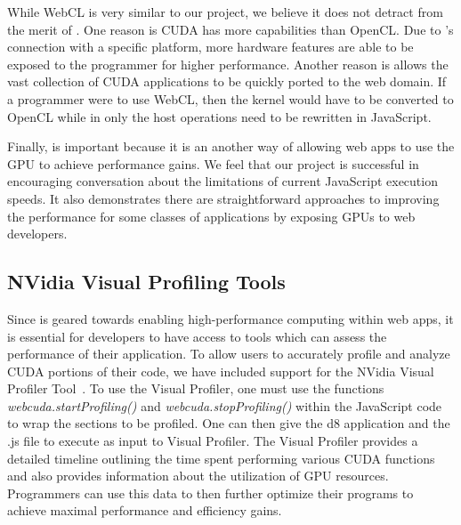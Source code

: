 While WebCL is very similar to our project, we believe it does not detract from
the merit of \namens. One reason is CUDA has more capabilities than OpenCL. Due
to \namens's connection with a specific platform, more hardware features are
able to be exposed to the programmer for higher performance. Another reason is
\name allows the vast collection of CUDA applications to be quickly ported to
the web domain. If a programmer were to use WebCL, then the kernel would have to
be converted to OpenCL while in \name only the host operations need to be
rewritten in JavaScript.

Finally, \name is important because it is an another way of allowing web apps
to use the GPU to achieve performance gains. We feel that our project is
successful in encouraging conversation about the limitations of current JavaScript
execution speeds. It also demonstrates there are straightforward approaches to
improving the performance for some classes of applications by exposing GPUs to
web developers.



\subsection{NVidia Visual Profiling Tools} \label{visualProfiler} Since \name is
geared towards enabling high-performance computing within web apps, it is
essential for developers to have access to tools which can assess the
performance of their application. To allow \name users to accurately profile and
analyze CUDA portions of their code, we have included support for the NVidia
Visual Profiler Tool~\cite{visualProfiler}. To use the Visual Profiler, one must
use the functions \textit{webcuda.startProfiling()} and
\textit{webcuda.stopProfiling()} within the JavaScript code to wrap the 
sections to be profiled. One can then give the d8 application and the .js file to execute as
input to Visual Profiler. The Visual Profiler provides a detailed timeline
outlining the time spent performing various CUDA functions and also provides
information about the utilization of GPU resources. Programmers can use this
data to then further optimize their programs to achieve maximal performance and
efficiency gains.

